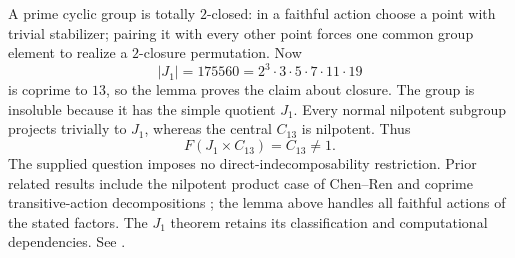 A prime cyclic group is totally \(2\)-closed: in a faithful action
choose a point with trivial stabilizer; pairing it with every other
point forces one common group element to realize a \(2\)-closure
permutation.
Now
\[
 |J_1|=175560=2^3\cdot3\cdot5\cdot7\cdot11\cdot19
\]
is coprime to \(13\), so the lemma proves the claim about closure.
The group is insoluble because it has the simple quotient \(J_1\).
Every normal nilpotent subgroup projects trivially to \(J_1\),
whereas the central \(C_{13}\) is nilpotent. Thus
\[
 F(J_1\times C_{13})=C_{13}\ne1.
\]
The supplied question imposes no direct-indecomposability restriction.
Prior related results include the nilpotent product case of
Chen--Ren and coprime transitive-action decompositions
\cite{chen-ren,abdollahi-arezoomand-tracey}; the lemma above handles
all faithful actions of the stated factors.
The \(J_1\) theorem retains its classification and computational
dependencies. See .
